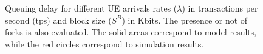 \documentclass[conference]{IEEEtran}
\theoremstyle{definition}
\begin{document}
\begin{figure}[ht!]
\centering
{} 
 
\caption{Queuing delay for different UE arrivals rates ($\lambda$) in transactions per second (tps) and block size ($S^B$) in Kbits. The presence or not of forks is also evaluated. The solid areas correspond to model results, while the red circles correspond to simulation results.}
\label{fig:total_delay}
\end{figure}
\end{document}
